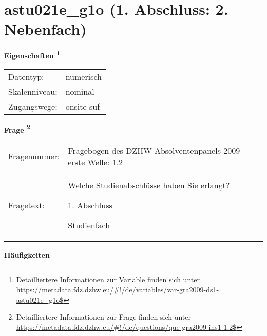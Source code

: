 
    \setcounter{footnote}{0}

    \vspace*{-1.8cm}
	\section{astu021e\_g1o (1. Abschluss: 2. Nebenfach)}
	\label{section:astu021e_g1o}



    \vspace*{0.5cm}
    \noindent\textbf{Eigenschaften
	\footnote{Detailliertere Informationen zur Variable finden sich unter
		\url{https://metadata.fdz.dzhw.eu/\#!/de/variables/var-gra2009-ds1-astu021e_g1o$}}}\\
	\begin{tabularx}{\hsize}{@{}lX}
	Datentyp: & numerisch \\
	Skalenniveau: & nominal \\
	Zugangswege: &
	  onsite-suf
 \\
    \end{tabularx}



				\vspace*{0.5cm}
                \noindent\textbf{Frage
	                \footnote{Detailliertere Informationen zur Frage finden sich unter
		              \url{https://metadata.fdz.dzhw.eu/\#!/de/questions/que-gra2009-ins1-1.2$}}}\\
				\begin{tabularx}{\hsize}{@{}lX}
					Fragenummer: &
					  Fragebogen des DZHW-Absolventenpanels 2009 - erste Welle:
					  1.2
 \\
					Fragetext: & Welche Studienabschlüsse haben Sie erlangt?\par  1. Abschluss\par  Studienfach \\
				\end{tabularx}





        		\vspace*{0.5cm}
                \noindent\textbf{Häufigkeiten}


